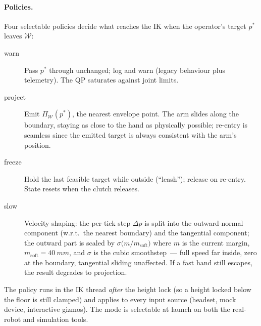 \paragraph{Policies.}
Four selectable policies decide what reaches the IK when the operator's
target \(p^\ast\) leaves \(\mathcal{W}\):
\begin{description}
  \item[warn] Pass \(p^\ast\) through unchanged; log and warn (legacy
    behaviour plus telemetry). The QP saturates against joint limits.
  \item[project] Emit \(\Pi_{\mathcal{W}}(p^\ast)\), the nearest envelope
    point. The arm slides along the boundary, staying as close to the
    hand as physically possible; re-entry is seamless since the emitted
    target is always consistent with the arm's position.
  \item[freeze] Hold the last feasible target while outside (``leash'');
    release on re-entry. State resets when the clutch releases.
  \item[slow] Velocity shaping: the per-tick step \(\Delta p\) is split
    into the outward-normal component (w.r.t.\ the nearest boundary) and
    the tangential component; the outward part is scaled by
    \(\sigma\bigl(m/m_{\mathrm{soft}}\bigr)\) where \(m\) is the current
    margin, \(m_{\mathrm{soft}}=\SI{40}{mm}\), and \(\sigma\) is the
    cubic smoothstep~--- full speed far inside, zero at the boundary,
    tangential sliding unaffected. If a fast hand still escapes, the
    result degrades to projection.
\end{description}
The policy runs in the IK thread \emph{after} the height lock (so a
height locked below the floor is still clamped) and applies to every
input source (headset, mock device, interactive gizmos). The mode is
selectable at launch on both the real-robot and simulation tools.

